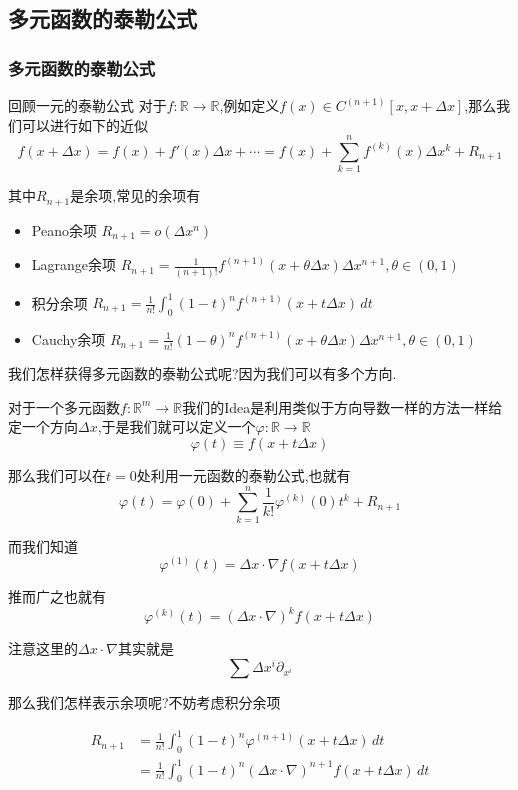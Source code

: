 \documentclass[11pt,hyperref,a4paper,UTF8]{ctexart}
\newcommand{\RR}{\mathbb{R}}
\begin{document}
\begin{CJK}{UTF8}{gkai}
\subsection{多元函数的泰勒公式}
\subsubsection{多元函数的泰勒公式}
回顾一元的泰勒公式
对于$f:\RR \to \RR$,例如定义$f(x) \in C^{(n + 1)}[x,x + \Delta x]$,那么我们可以进行如下的近似
\[f(x + \Delta x) = f(x) + f'(x) \Delta x+ \cdots = f(x) + \sum_{k = 1}^{n}f^{(k)}(x) \Delta x^k + R_{n + 1}\]

其中$R_{n + 1}$是余项,常见的余项有
\begin{itemize}
  \item Peano余项 $R_{n + 1} = o(\Delta x^n)$
  \item Lagrange余项 $R_{n + 1} = \frac{1}{(n + 1)!}f^{(n + 1)}(x + \theta \Delta x) \Delta x^{n + 1}, \theta \in (0,1)$
  \item 积分余项 $R_{n + 1} = \frac{1}{n!} \int_{0}^{1}(1 - t)^{n} f^{(n + 1)}(x + t\Delta x)\, dt$
  \item Cauchy余项 $R_{n + 1} = \frac{1}{n!} (1 - \theta)^n f^{(n + 1)}(x + \theta \Delta x) \Delta x^{n + 1}, \theta \in (0,1)$
\end{itemize}

我们怎样获得多元函数的泰勒公式呢?因为我们可以有多个方向.

对于一个多元函数$f: \RR^m \to \RR$我们的Idea是利用类似于方向导数一样的方法一样给定一个方向$\Delta x $,于是我们就可以定义一个$\varphi: \RR \to \RR$
\[\varphi(t) \equiv f(x + t \Delta x)\]

那么我们可以在$t = 0$处利用一元函数的泰勒公式,也就有
\[\varphi(t) = \varphi(0) + \sum_{k = 1}^{n} \frac{1}{k!}\varphi^{(k)}(0)t^k + R_{n + 1}\]

而我们知道
\[\varphi^{(1)}(t) = \Delta x \cdot \nabla f(x + t \Delta x)\]

推而广之也就有
\[\varphi^{(k)}(t) = (\Delta x \cdot \nabla)^k f(x + t \Delta x)\]

注意这里的$\Delta x \cdot \nabla$其实就是
\[\sum \Delta x^i \partial_{x^i}\]

那么我们怎样表示余项呢?不妨考虑积分余项

\[
\begin{aligned}
  R_{n + 1} &= \frac{1}{n!} \int_{0}^{1}(1 - t)^{n} \varphi^{(n + 1)}(x + t\Delta x)\, dt\\
  &= \frac{1}{n !} \int_{0}^{1}(1 - t)^n (\Delta x \cdot \nabla)^{n + 1} f(x + t\Delta x)\, dt\\
\end{aligned}  
\]


\end{CJK}
\end{document}
